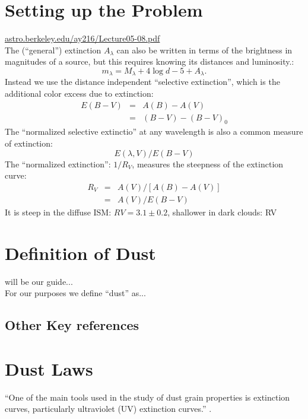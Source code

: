 \documentclass[11pt]{article}
\begin{document}
\section{Setting up the Problem}
\href{astro.berkeley.edu/ay216/Lecture05-08.pdf}{astro.berkeley.edu/ay216/Lecture05-08.pdf}\\


\noindent
The (“general”) extinction $A_{\lambda}$ can also be written in terms
of the brightness in magnitudes of a source, but this requires knowing
its distances and luminosity.:
\begin{equation}
m_{\lambda} = M_{\lambda} + 4 \log d - 5 + A_{\lambda}.
\end{equation} 
Instead we use the distance independent ``selective extinction'', which is the additional color excess due to extinction:
\begin{eqnarray}
  E(B-V) & = & A(B)-A(V) \\
             & = & (B-V) - (B-V)_{0}
\end{eqnarray} 
The ``normalized selective extinctio'' at any wavelength is also a
common measure of extinction:
\begin{equation}
  E(\lambda, V) / E(B-V)
\end{equation} 
The ``normalized extinction'': $1/R_{V}$, measures the steepness of
the extinction curve:
\begin{eqnarray}
  R_{V} & = &   A(V) / \left [ A(B)-A(V) \right ] \\
          & = &  A(V) / E(B-V)
\end{eqnarray} 
It is steep in the diffuse ISM: $RV = 3.1±0.2$, shallower in dark clouds: RV 


\section{Definition of Dust}
\citet{Draine03} will be our guide... \\
For our purposes we define ``dust'' as... \\

\subsection{Other Key references}
\citet{Pei92}



\section{Dust Laws} 
``One of the main tools used in the study of dust grain properties is
extinction curves, particularly ultraviolet (UV) extinction curves.''
\citep{Gordom03}.
\end{document}
